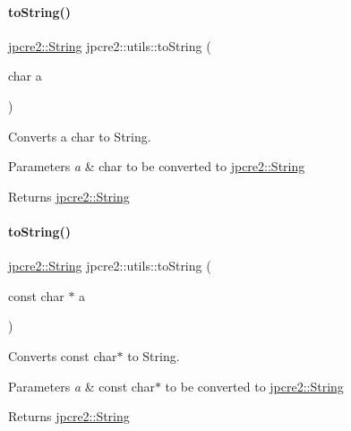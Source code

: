 \paragraph{\texorpdfstring{to\+String()}{toString()}\hspace{0.1cm}{\footnotesize\ttfamily [2/4]}}
{\footnotesize\ttfamily \hyperlink{namespacejpcre2_a91f03070152fb228bc116c5a737f1d16}{jpcre2\+::\+String} jpcre2\+::utils\+::to\+String (\begin{DoxyParamCaption}\item[{char}]{a }\end{DoxyParamCaption})}



Converts a char to String. 


\begin{DoxyParams}{Parameters}
{\em a} & char to be converted to \hyperlink{namespacejpcre2_a91f03070152fb228bc116c5a737f1d16}{jpcre2\+::\+String} \\
\hline
\end{DoxyParams}
\begin{DoxyReturn}{Returns}
\hyperlink{namespacejpcre2_a91f03070152fb228bc116c5a737f1d16}{jpcre2\+::\+String} 
\end{DoxyReturn}
\hypertarget{namespacejpcre2_1_1utils_a4065a2a40144999cd2a94e7a7e1d5eb6_a4065a2a40144999cd2a94e7a7e1d5eb6}{}\label{namespacejpcre2_1_1utils_a4065a2a40144999cd2a94e7a7e1d5eb6_a4065a2a40144999cd2a94e7a7e1d5eb6} 
\paragraph{\texorpdfstring{to\+String()}{toString()}\hspace{0.1cm}{\footnotesize\ttfamily [3/4]}}
{\footnotesize\ttfamily \hyperlink{namespacejpcre2_a91f03070152fb228bc116c5a737f1d16}{jpcre2\+::\+String} jpcre2\+::utils\+::to\+String (\begin{DoxyParamCaption}\item[{const char $\ast$}]{a }\end{DoxyParamCaption})}



Converts const char$\ast$ to String. 


\begin{DoxyParams}{Parameters}
{\em a} & const char$\ast$ to be converted to \hyperlink{namespacejpcre2_a91f03070152fb228bc116c5a737f1d16}{jpcre2\+::\+String} \\
\hline
\end{DoxyParams}
\begin{DoxyReturn}{Returns}
\hyperlink{namespacejpcre2_a91f03070152fb228bc116c5a737f1d16}{jpcre2\+::\+String} 
\end{DoxyReturn}
\hypertarget{namespacejpcre2_1_1utils_aea66a35f467adf41730c5a3bb21be6ed_aea66a35f467adf41730c5a3bb21be6ed}{}\label{namespacejpcre2_1_1utils_aea66a35f467adf41730c5a3bb21be6ed_aea66a35f467adf41730c5a3bb21be6ed} 
